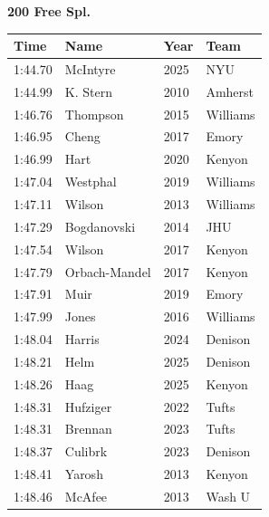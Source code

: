 \noindent\begin{minipage}[t]{0.98\textwidth}
\centering
\textbf{\textcolor{teamprimary}{200 Free Spl.}}\par
\vspace{0.5em}
\centering
\small
\renewcommand{\arraystretch}{1.0}
\setlength{\tabcolsep}{4pt}
\begin{tabular}{@{}p{2.5cm}p{4.5cm}p{1.5cm}p{2.5cm}@{}}
\toprule
\textbf{Time} & \textbf{Name} & \textbf{Year} & \textbf{Team} \\
\midrule
1:44.70 & McIntyre & 2025 & NYU \\
1:44.99 & K. Stern & 2010 & Amherst \\
1:46.76 & Thompson & 2015 & Williams \\
1:46.95 & Cheng & 2017 & Emory \\
1:46.99 & Hart & 2020 & Kenyon \\
1:47.04 & Westphal & 2019 & Williams \\
1:47.11 & Wilson & 2013 & Williams \\
1:47.29 & Bogdanovski & 2014 & JHU \\
1:47.54 & Wilson & 2017 & Kenyon \\
1:47.79 & Orbach-Mandel & 2017 & Kenyon \\
1:47.91 & Muir & 2019 & Emory \\
1:47.99 & Jones & 2016 & Williams \\
1:48.04 & Harris & 2024 & Denison \\
1:48.21 & Helm & 2025 & Denison \\
1:48.26 & Haag & 2025 & Kenyon \\
1:48.31 & Hufziger & 2022 & Tufts \\
1:48.31 & Brennan & 2023 & Tufts \\
1:48.37 & Culibrk & 2023 & Denison \\
1:48.41 & Yarosh & 2013 & Kenyon \\
1:48.46 & McAfee & 2013 & Wash U \\
\bottomrule
\end{tabular}
\end{minipage}
\vspace{1.2em}
